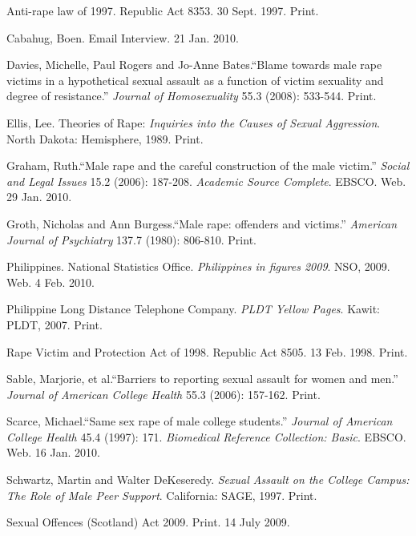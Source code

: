 \begin{workscited}

\bibent
Anti-rape law of 1997. Republic Act 8353. 30 Sept. 1997. Print.

\bibent
Cabahug, Boen. Email Interview. 21 Jan. 2010.
	
\bibent
Davies, Michelle, Paul Rogers and Jo-Anne Bates.``Blame towards male rape victims in a hypothetical sexual assault as a function of victim sexuality and degree of resistance.'' \textit{Journal of Homosexuality} 55.3 (2008): 533-544. Print.

\bibent
Ellis, Lee. Theories of Rape: \textit{Inquiries into the Causes of Sexual Aggression}. North Dakota: Hemisphere, 1989. Print.

\bibent
Graham, Ruth.``Male rape and the careful construction of the male victim.'' \textit{Social and Legal Issues} 15.2 (2006): 187-208. \textit{Academic Source Complete}. EBSCO. Web. 29 Jan. 2010.

\bibent
Groth, Nicholas and Ann Burgess.``Male rape: offenders and victims.'' \textit{American Journal of Psychiatry} 137.7 (1980): 806-810. Print.

\bibent
Philippines. National Statistics Office. \textit{Philippines in figures 2009}. NSO, 2009. Web. 4 Feb. 2010.

\bibent
Philippine Long Distance Telephone Company. \textit{PLDT Yellow Pages}. Kawit: PLDT, 2007. Print.

\bibent
Rape Victim and Protection Act of 1998. Republic Act 8505. 13 Feb. 1998. Print.

\bibent
Sable, Marjorie, et al.``Barriers to reporting sexual assault for women and men.'' \textit{Journal of American College Health} 55.3 (2006): 157-162. Print.

\bibent
Scarce, Michael.``Same sex rape of male college students.'' \textit{Journal of American College Health} 45.4 (1997): 171. \textit{Biomedical Reference Collection: Basic}. EBSCO. Web. 16 Jan. 2010.

\bibent
Schwartz, Martin and Walter DeKeseredy. \textit{Sexual Assault on the College Campus: The Role of Male Peer Support}. California: SAGE, 1997. Print.

\bibent
Sexual Offences (Scotland) Act 2009. Print. 14 July 2009.

\end{workscited}

